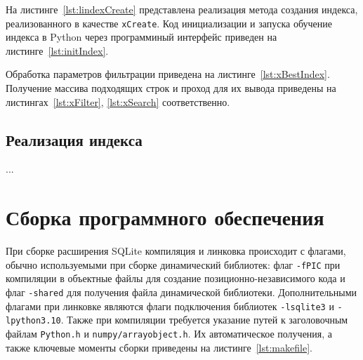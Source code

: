 
На листинге~\ref{lst:lindexCreate} представлена реализация метода создания
индекса, реализованного в качестве \texttt{xCreate}. Код инициализации и запуска
обучение индекса в Python через программиный интерфейс приведен на
листинге~\ref{lst:initIndex}.

%

Обработка параметров фильтрации приведена на листинге~\ref{lst:xBestIndex}.
Получение массива подходящих строк и проход для их вывода приведены на
листингах~\ref{lst:xFilter}, \ref{lst:xSearch} соответственно.

%
%

\subsection{Реализация индекса}

...

\section{Сборка программного обеспечения}

При сборке расширения SQLite компиляция и линковка происходит с флагами,
обычно используемыми при сборке динамический библиотек: флаг \texttt{-fPIC} при
компиляции в объектные файлы для создание позиционно-независимого кода и флаг
\texttt{-shared} для получения файла динамической библиотеки. Дополнительными
флагами при линковке являются флаги подключения библиотек \texttt{-lsqlite3} и
\texttt{-lpython3.10}. Также при компиляции требуется указание путей к
заголовочным файлам \texttt{Python.h} и \texttt{numpy/arrayobject.h}. Их
автоматическое получения, а также ключевые моменты сборки приведены на
листинге~\ref{lst:makefile}.

